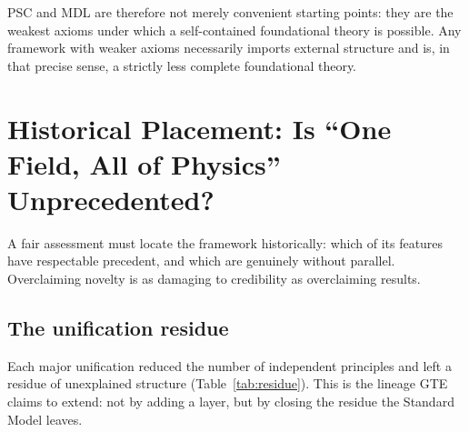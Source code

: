 \documentclass[11pt]{article}
\begin{document}
PSC and MDL are therefore not merely
convenient starting points: they are the weakest axioms under which a self-contained
foundational theory is possible.  Any framework with weaker axioms necessarily imports
external structure and is, in that precise sense, a strictly less complete foundational
theory.

\section{Historical Placement: Is ``One Field, All of Physics'' Unprecedented?}
\label{sec:history}

A fair assessment must locate the framework historically: which of its features
have respectable precedent, and which are genuinely without parallel.  Overclaiming
novelty is as damaging to credibility as overclaiming results.

\subsection{The unification residue}

Each major unification reduced the number of independent principles and left a
residue of unexplained structure (Table~\ref{tab:residue}).  This is the lineage
GTE claims to extend: not by adding a layer, but by closing the residue the
Standard Model leaves.
\end{document}
